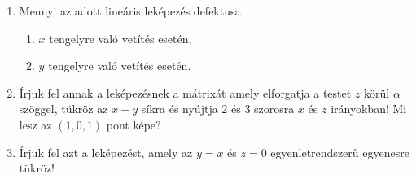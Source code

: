 \documentclass[a4paper, 12pt]{scrartcl}
\begin{document}
\begin{enumerate}
\begin{multicols}{2}
\begin{enumerate}
            \item $Q'(1,4,0)$ ősképe-e?
            \item Mennyi a képtér dimenziójának rangja?
            \item Mennyi a defektus?
          \end{enumerate}
        \end{multicols}
  \item Mennyi az adott lineáris leképezés defektusa
        \begin{enumerate}
          \item $x$ tengelyre való vetítés esetén,
          \item $y$ tengelyre való vetítés esetén.
        \end{enumerate}
  \item Írjuk fel annak a leképezésnek a mátrixát amely elforgatja a testet $z$ körül $\alpha$ szöggel, tükröz az $x-y$ síkra és nyújtja 2 és 3 szorosra $x$ és $z$ irányokban! Mi lesz az $(1,0,1)$ pont képe?
  \item Írjuk fel azt a leképezést, amely az $y=x$ és $z=0$ egyenletrendszerű egyenesre tükröz!
\end{enumerate}
\end{document}
